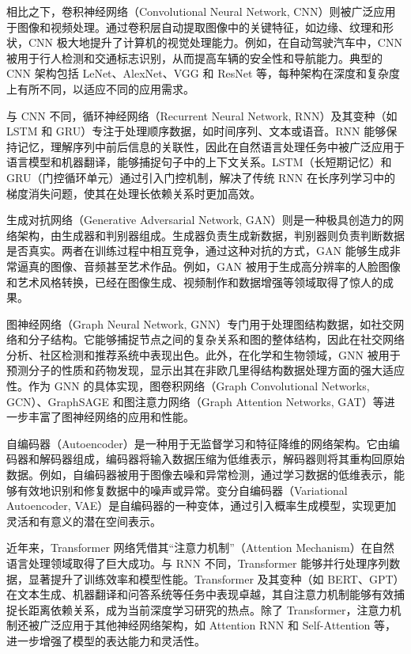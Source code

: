 相比之下，卷积神经网络（Convolutional Neural Network, CNN）则被广泛应用于图像和视频处理。通过卷积层自动提取图像中的关键特征，如边缘、纹理和形状，CNN 极大地提升了计算机的视觉处理能力。例如，在自动驾驶汽车中，CNN 被用于行人检测和交通标志识别，从而提高车辆的安全性和导航能力。典型的 CNN 架构包括 LeNet、AlexNet、VGG 和 ResNet 等，每种架构在深度和复杂度上有所不同，以适应不同的应用需求。

与 CNN 不同，循环神经网络（Recurrent Neural Network, RNN）及其变种（如 LSTM 和 GRU）专注于处理顺序数据，如时间序列、文本或语音。RNN 能够保持记忆，理解序列中前后信息的关联性，因此在自然语言处理任务中被广泛应用于语言模型和机器翻译，能够捕捉句子中的上下文关系。LSTM（长短期记忆）和 GRU（门控循环单元）通过引入门控机制，解决了传统 RNN 在长序列学习中的梯度消失问题，使其在处理长依赖关系时更加高效。

生成对抗网络（Generative Adversarial Network, GAN）则是一种极具创造力的网络架构，由生成器和判别器组成。生成器负责生成新数据，判别器则负责判断数据是否真实。两者在训练过程中相互竞争，通过这种对抗的方式，GAN 能够生成非常逼真的图像、音频甚至艺术作品。例如，GAN 被用于生成高分辨率的人脸图像和艺术风格转换，已经在图像生成、视频制作和数据增强等领域取得了惊人的成果。

图神经网络（Graph Neural Network, GNN）专门用于处理图结构数据，如社交网络和分子结构。它能够捕捉节点之间的复杂关系和图的整体结构，因此在社交网络分析、社区检测和推荐系统中表现出色。此外，在化学和生物领域，GNN 被用于预测分子的性质和药物发现，显示出其在非欧几里得结构数据处理方面的强大适应性。作为 GNN 的具体实现，图卷积网络（Graph Convolutional Networks, GCN）、GraphSAGE 和图注意力网络（Graph Attention Networks, GAT）等进一步丰富了图神经网络的应用和性能。

自编码器（Autoencoder）是一种用于无监督学习和特征降维的网络架构。它由编码器和解码器组成，编码器将输入数据压缩为低维表示，解码器则将其重构回原始数据。例如，自编码器被用于图像去噪和异常检测，通过学习数据的低维表示，能够有效地识别和修复数据中的噪声或异常。变分自编码器（Variational Autoencoder, VAE）是自编码器的一种变体，通过引入概率生成模型，实现更加灵活和有意义的潜在空间表示。

近年来，Transformer 网络凭借其“注意力机制”（Attention Mechanism）在自然语言处理领域取得了巨大成功。与 RNN 不同，Transformer 能够并行处理序列数据，显著提升了训练效率和模型性能。Transformer 及其变种（如 BERT、GPT）在文本生成、机器翻译和问答系统等任务中表现卓越，其自注意力机制能够有效捕捉长距离依赖关系，成为当前深度学习研究的热点。除了 Transformer，注意力机制还被广泛应用于其他神经网络架构，如 Attention RNN 和 Self-Attention 等，进一步增强了模型的表达能力和灵活性。

